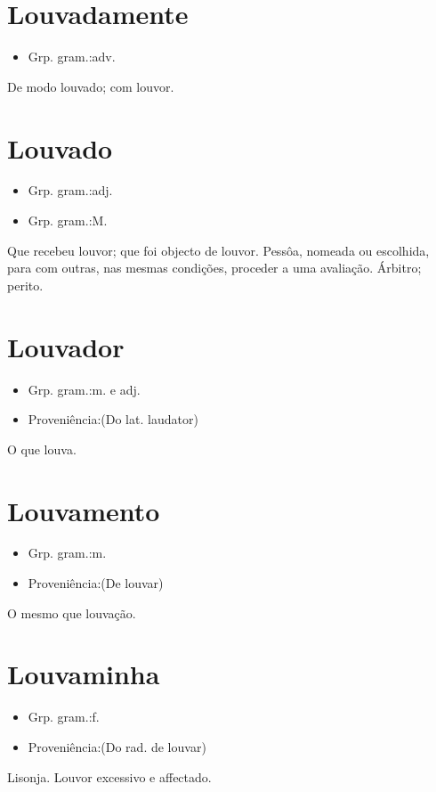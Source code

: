 \section{Louvadamente}
\begin{itemize}
\item {Grp. gram.:adv.}
\end{itemize}
De modo louvado; com louvor.
\section{Louvado}
\begin{itemize}
\item {Grp. gram.:adj.}
\end{itemize}
\begin{itemize}
\item {Grp. gram.:M.}
\end{itemize}
Que recebeu louvor; que foi objecto de louvor.
Pessôa, nomeada ou escolhida, para com outras, nas mesmas condições, proceder a uma avaliação.
Árbitro; perito.
\section{Louvador}
\begin{itemize}
\item {Grp. gram.:m.  e  adj.}
\end{itemize}
\begin{itemize}
\item {Proveniência:(Do lat. \textunderscore laudator\textunderscore )}
\end{itemize}
O que louva.
\section{Louvamento}
\begin{itemize}
\item {Grp. gram.:m.}
\end{itemize}
\begin{itemize}
\item {Proveniência:(De \textunderscore louvar\textunderscore )}
\end{itemize}
O mesmo que \textunderscore louvação\textunderscore .
\section{Louvaminha}
\begin{itemize}
\item {Grp. gram.:f.}
\end{itemize}
\begin{itemize}
\item {Proveniência:(Do rad. de \textunderscore louvar\textunderscore )}
\end{itemize}
Lisonja.
Louvor excessivo e affectado.
